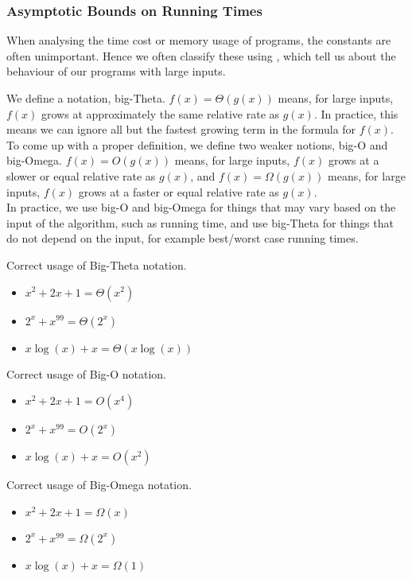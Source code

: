 \documentclass[11pt]{report}
\begin{document}
\subsubsection{Asymptotic Bounds on Running Times}
When analysing the time cost or memory usage of programs, the constants are often unimportant. Hence we often classify these using , which tell us about the behaviour of our programs with large inputs. 
\begin{intuition}
    We define a notation, big-Theta. $f(x) = \Theta(g(x))$ means, for large inputs, $f(x)$ grows at approximately the same relative rate as $g(x)$. In practice, this means we can ignore all but the fastest growing term in the formula for $f(x)$.
    \\ To come up with a proper definition, we define two weaker notions, big-O and big-Omega. $f(x) = O(g(x))$ means, for large inputs, $f(x)$ grows at a slower or equal relative rate as $g(x)$, and $f(x) = \Omega(g(x))$ means, for large inputs, $f(x)$ grows at a faster or equal relative rate as $g(x)$.
    \\ In practice, we use big-O and big-Omega for things that may vary based on the input of the algorithm, such as running time, and use big-Theta for things that do not depend on the input, for example best/worst case running times.
\end{intuition}
\begin{egs}  Correct usage of Big-Theta notation.
    \begin{itemize}
        \item $x^2 + 2x + 1 = \Theta(x^2)$ 
        \item $2^x + x^{99} = \Theta(2^x)$ 
        \item $x\log(x) + x = \Theta(x\log(x))$ 
    \end{itemize}
    Correct usage of Big-O notation.
    \begin{itemize}
        \item $x^2 + 2x + 1 = O(x^4)$ 
        \item $2^x + x^{99} = O(2^x)$ 
        \item $x\log(x) + x = O(x^2)$ 
    \end{itemize}
    Correct usage of Big-Omega notation.
    \begin{itemize}
        \item $x^2 + 2x + 1 = \Omega(x)$ 
        \item $2^x + x^{99} = \Omega(2^x)$ 
        \item $x\log(x) + x = \Omega(1)$ 
    \end{itemize}
\end{egs}
\end{document}
